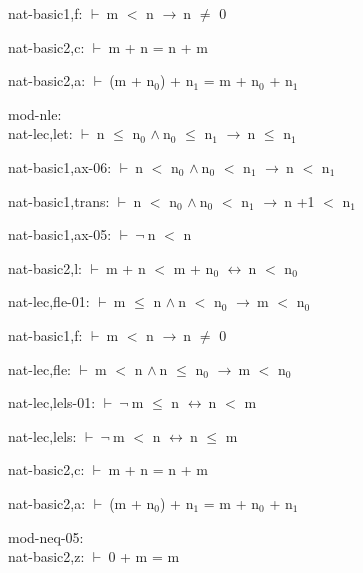 \documentclass[a4paper]{article}
\newcommand{\Fol}{\mbox{$\vdash\ $}}
\newcommand{\Not}{\mbox{$\neg\ $}}
\newcommand{\And}{\mbox{$\wedge\ $}}
\newcommand{\Imp}{\mbox{$\rightarrow\ $}}
\newcommand{\Equiv}{\mbox{$\leftrightarrow\ $}}
\begin{document}
nat-basic1,f: 
 \Fol m $<$ n \Imp n $\neq$ 0



nat-basic2,c: 
 \Fol m + n = n + m



nat-basic2,a: 
 \Fol (m + $\mbox{n}_{0}$) + $\mbox{n}_{1}$ = m + $\mbox{n}_{0}$ + $\mbox{n}_{1}$



\bigskip

mod-nle:\\ nat-lec,let: 
 \Fol n $\le$ $\mbox{n}_{0}$ \And $\mbox{n}_{0}$ $\le$ $\mbox{n}_{1}$ \Imp n $\le$ $\mbox{n}_{1}$



nat-basic1,ax-06: 
 \Fol n $<$ $\mbox{n}_{0}$ \And $\mbox{n}_{0}$ $<$ $\mbox{n}_{1}$ \Imp n $<$ $\mbox{n}_{1}$



nat-basic1,trans: 
 \Fol n $<$ $\mbox{n}_{0}$ \And $\mbox{n}_{0}$ $<$ $\mbox{n}_{1}$ \Imp n +1 $<$ $\mbox{n}_{1}$



nat-basic1,ax-05: 
 \Fol \Not n $<$ n



nat-basic2,l: 
 \Fol m + n $<$ m + $\mbox{n}_{0}$ \Equiv n $<$ $\mbox{n}_{0}$



nat-lec,fle-01: 
 \Fol m $\le$ n \And n $<$ $\mbox{n}_{0}$ \Imp m $<$ $\mbox{n}_{0}$



nat-basic1,f: 
 \Fol m $<$ n \Imp n $\neq$ 0



nat-lec,fle: 
 \Fol m $<$ n \And n $\le$ $\mbox{n}_{0}$ \Imp m $<$ $\mbox{n}_{0}$



nat-lec,lels-01: 
 \Fol \Not m $\le$ n \Equiv n $<$ m



nat-lec,lels: 
 \Fol \Not m $<$ n \Equiv n $\le$ m



nat-basic2,c: 
 \Fol m + n = n + m



nat-basic2,a: 
 \Fol (m + $\mbox{n}_{0}$) + $\mbox{n}_{1}$ = m + $\mbox{n}_{0}$ + $\mbox{n}_{1}$



\bigskip

mod-neq-05:\\ nat-basic2,z: 
 \Fol 0 + m = m
\end{document}
